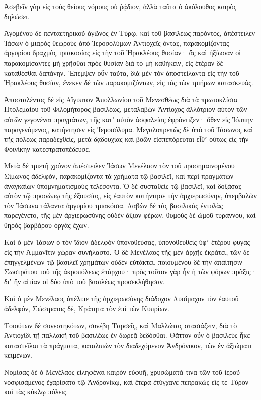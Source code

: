 {Ἀσεβεῖν γὰρ εἰς τοὺς θείους νόμους οὐ ῥᾴδιον, ἀλλὰ ταῦτα ὁ ἀκόλουθος καιρὸς δηλώσει.
\par }{\PP {}Ἀγομένου δὲ πενταετηρικοῦ ἀγῶνος ἐν Τύρῳ, καὶ τοῦ βασιλέως παρόντος,
ἀπέστειλεν Ἰάσων ὁ μιαρὸς θεωροὺς ἀπὸ Ἱεροσολύμων Ἀντιοχεῖς ὄντας, παρακομίζοντας ἀργυρίου δραχμὰς τριακοσίας εἰς τὴν τοῦ Ἡρακλέους θυσίαν· ἃς καὶ ἠξίωσαν οἱ παρακομίσαντες μὴ χρῆσθαι πρὸς θυσίαν διὰ τὸ μὴ καθήκειν, εἰς ἑτέραν δὲ καταθέσθαι δαπάνην.
Ἔπεμψεν οὖν ταῦτα, διὰ μὲν τὸν ἀποστείλαντα εἰς τὴν τοῦ Ἡρακλέους θυσίαν, ἕνεκεν δὲ τῶν παρακομιζόντων, εἰς τὰς τῶν τριήρων κατασκευάς.
\par }{\PP {}Ἀποσταλέντος δὲ εἰς Αἴγυπτον Ἀπολλωνίου τοῦ Μενεσθέως διὰ τὰ πρωτοκλίσια Πτολεμαίου τοῦ Φιλομήτορος βασιλέως, μεταλαβὼν Ἀντίοχος ἀλλότριον αὐτὸν τῶν αὐτῶν γεγονέναι πραγμάτων, τῆς κατʼ αὑτὸν ἀσφαλείας ἐφρόντιζεν· ὅθεν εἰς Ἰόππην παραγενόμενος, κατήντησεν εἰς Ἰεροσόλυμα.
Μεγαλοπρεπῶς δὲ ὑπὸ τοῦ Ἰάσωνος καὶ τῆς πόλεως παραδεχθεὶς, μετὰ δᾳδουχίας καὶ βοῶν εἰσπεπόρευται εἶθʼ οὕτως εἰς τὴν Φοινίκην κατεστρατοπέδευσε.
\par }{\PP {}Μετὰ δὲ τριετῆ χρόνον ἀπέστειλεν Ἰάσων Μενέλαον τὸν τοῦ προσημαινομένου Σίμωνος ἀδελφόν, παρακομίζοντα τὰ χρήματα τῷ βασιλεῖ, καὶ περὶ πραγμάτων ἀναγκαίων ὑπομνηματισμοὺς τελέσοντα.
Ὁ δὲ συσταθεὶς τῷ βασιλεῖ, καὶ δοξάσας αὐτὸν τῷ προσώπῳ τῆς ἐξουσίας, εἰς ἑαυτὸν κατήντησε τὴν ἀρχιερωσύνην, ὑπερβαλὼν τὸν Ἰάσωνα τάλαντα ἀργυρίου τριακόσια.
Λαβὼν δὲ τὰς βασιλικὰς ἐντολὰς παρεγένετο, τῆς μὲν ἀρχιερωσύνης οὐδὲν ἄξιον φέρων, θυμοὺς δὲ ὠμοῦ τυράννου, καὶ θηρὸς βαρβάρου ὀργὰς ἔχων.
\par }{\PP {}Καὶ ὁ μὲν Ἰάσων ὁ τὸν ἴδιον ἀδελφὸν ὑπονοθεύσας, ὑπονοθευθεὶς ὑφʼ ἑτέρου φυγὰς εἰς τὴν Ἀμμανῖτιν χώραν συνήλαστο.
Ὁ δὲ Μενέλαος τῆς μὲν ἀρχῆς ἐκράτει, τῶν δὲ ἐπηγγελμένων τῷ βασιλεῖ χρημάτων οὐδὲν εὐτάκτει,
ποιουμένου δὲ τὴν ἀπαίτησιν Σωστράτου τοῦ τῆς ἀκροπόλεως ἐπάρχου· πρὸς τοῦτον γὰρ ἦν ἡ τῶν φόρων πρᾶξις· διʼ ἣν αἰτίαν οἱ δύο ὑπὸ τοῦ βασιλέως προσεκλήθησαν.
\par }{\PP {}Καὶ ὁ μὲν Μενέλαος ἀπέλιπε τῆς ἀρχιερωσύνης διάδοχον Λυσίμαχον τὸν ἑαυτοῦ ἀδελφόν, Σώστρατος δὲ, Κράτητα τὸν ἐπὶ τῶν Κυπρίων.
\par }{\PP {}Τοιούτων δὲ συνεστηκότων, συνέβη Ταρσεῖς, καὶ Μαλλώτας στασιάζειν, διὰ τὸ Ἀντιοχίδι τῇ παλλακῇ τοῦ βασιλέως ἐν δωρεᾷ δεδόσθαι.
Θᾶττον οὖν ὁ βασιλεὺς ἧκε καταστεῖλαι τὰ πράγματα, καταλιπὼν τὸν διαδεχόμενον Ἀνδρόνικον, τῶν ἐν ἀξιώματι κειμένων.
\par }{\PP {}Νομίσας δὲ ὁ Μενέλαος εἰληφέναι καιρὸν εὐφυῆ, χρυσώματά τινα τῶν τοῦ ἱεροῦ νοσφισάμενος ἐχαρίσατο τῷ Ἀνδρονίκῳ, καὶ ἕτερα ἐτύγχανε πεπρακὼς εἴς τε Τύρον καὶ τὰς κύκλῳ πόλεις.
}
